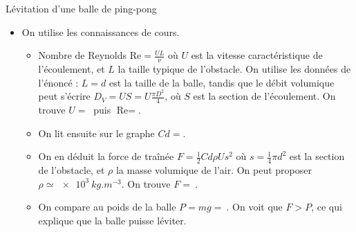 \begin{exo}[2][oral]{Lévitation d’une balle de ping-pong}
{\begin{itemize}
    \item On utilise les connaissances de cours.
    \begin{itemize}
      \item
    Nombre de Reynolds $\text{Re} = \frac{UL}{\nu}$ où $U$ est la vitesse caractéristique de l'écoulement, et $L$ la taille typique de l'obstacle. On utilise les données de l'énoncé : $L=d$ est la taille de la balle, tandis que le débit volumique peut s'écrire $D_V = U S = U \frac{\pi D^2}{4}$, où $S$ est la section de l'écoulement. On trouve $U=\SI{}{}$ puis $\text{Re} = $.
    \item On lit ensuite sur le graphe $Cd = $.
    \item On en déduit la force de traînée $F = \frac{1}{2} Cd \rho U s^2$ où $s=\frac{1}{4}\pi d^2$
    est la section de l'obstacle, et $\rho$ la masse volumique de l'air. On peut proposer $\rho \simeq \SI{e3}{kg.m^{-3}}$. On trouve $F = \SI{}{}$.
    \item On compare au poids de la balle $P=mg = \SI{}{}$. On voit que $F>P$, ce qui explique que la balle puisse léviter.
  \end{itemize}
  \end{itemize}
  }
  \end{exo}
